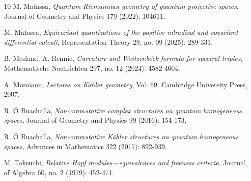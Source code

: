 \documentclass[a4paper,12pt,reqno,english]{amsart}
\numberwithin{equation}{section}
\numberwithin{figure}{section}
\theoremstyle{plain}
\theoremstyle{plain}
\theoremstyle{plain}
\theoremstyle{plain}
\theoremstyle{plain}
\theoremstyle{definition}
\theoremstyle{definition}
\theoremstyle{definition}
\theoremstyle{remark}
\theoremstyle{definition}
\begin{document}
\begin{thebibliography}{10}
M. Matassa,
\textit{Quantum Riemannian geometry of quantum projective spaces},
Journal of Geometry and Physics 179 (2022): 104611.

M. Matassa,
\textit{Equivariant quantizations of the positive nilradical and covariant differential calculi},
Representation Theory 29, no. 09 (2025): 289-331.

B. Mesland, A. Rennie,
\textit{Curvature and Weitzenböck formula for spectral triples},
Mathematische Nachrichten 297, no. 12 (2024): 4582-4604.

A. Moroianu,
\textit{Lectures on Kähler geometry},
Vol. 69. Cambridge University Press, 2007.

R. Ó Buachalla,
\textit{Noncommutative complex structures on quantum homogeneous spaces},
Journal of Geometry and Physics 99 (2016): 154-173.

R. Ó Buachalla,
\textit{Noncommutative Kähler structures on quantum homogeneous spaces},
Advances in Mathematics 322 (2017): 892-939.

M. Takeuchi,
\textit{Relative Hopf modules—equivalences and freeness criteria},
Journal of Algebra 60, no. 2 (1979): 452-471.

\end{thebibliography}
\end{document}
